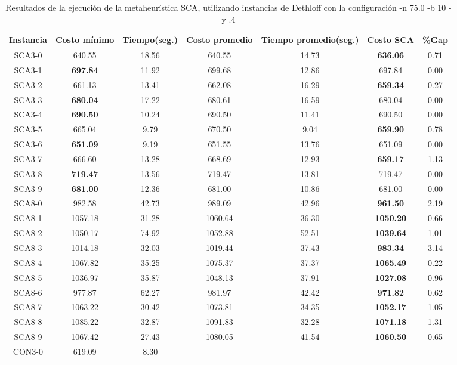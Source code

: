 \begin{table}[ht]
\caption{Resultados de la ejecución de la metaheurística SCA, utilizando instancias de Dethloff con la configuración -n 75.0 -b 10 -y .4}
\centering
\small
\begin{tabular}{c c c c c c c}
\hline\hline
Instancia & Costo mínimo & Tiempo(seg.) & Costo promedio & Tiempo promedio(seg.) & Costo SCA & \%Gap \\ [0.5ex]
\hline
SCA3-0 & 640.55 & 18.56 & 
640.55 & 14.73 & \bf{636.06} & 
0.71\\SCA3-1 & \bf{697.84} & 11.92 & 
699.68 & 12.86 & 697.84 & 0.00\\
SCA3-2 & 661.13 & 13.41 & 
662.08 & 16.29 & \bf{659.34} & 
0.27\\SCA3-3 & \bf{680.04} & 17.22 & 
680.61 & 16.59 & 680.04 & 0.00\\
SCA3-4 & \bf{690.50} & 10.24 & 
690.50 & 11.41 & 690.50 & 0.00\\
SCA3-5 & 665.04 & 9.79 & 
670.50 & 9.04 & \bf{659.90} & 
0.78\\SCA3-6 & \bf{651.09} & 9.19 & 
651.55 & 13.76 & 651.09 & 0.00\\
SCA3-7 & 666.60 & 13.28 & 
668.69 & 12.93 & \bf{659.17} & 
1.13\\SCA3-8 & \bf{719.47} & 13.56 & 
719.47 & 13.81 & 719.47 & 0.00\\
SCA3-9 & \bf{681.00} & 12.36 & 
681.00 & 10.86 & 681.00 & 0.00\\
SCA8-0 & 982.58 & 42.73 & 
989.09 & 42.96 & \bf{961.50} & 
2.19\\SCA8-1 & 1057.18 & 31.28 & 
1060.64 & 36.30 & \bf{1050.20} & 
0.66\\SCA8-2 & 1050.17 & 74.92 & 
1052.88 & 52.51 & \bf{1039.64} & 
1.01\\SCA8-3 & 1014.18 & 32.03 & 
1019.44 & 37.43 & \bf{983.34} & 
3.14\\SCA8-4 & 1067.82 & 35.25 & 
1075.37 & 37.37 & \bf{1065.49} & 
0.22\\SCA8-5 & 1036.97 & 35.87 & 
1048.13 & 37.91 & \bf{1027.08} & 
0.96\\SCA8-6 & 977.87 & 62.27 & 
981.97 & 42.42 & \bf{971.82} & 
0.62\\SCA8-7 & 1063.22 & 30.42 & 
1073.81 & 34.35 & \bf{1052.17} & 
1.05\\SCA8-8 & 1085.22 & 32.87 & 
1091.83 & 32.28 & \bf{1071.18} & 
1.31\\SCA8-9 & 1067.42 & 27.43 & 
1080.05 & 41.54 & \bf{1060.50} & 
0.65\\CON3-0 & 619.09 & 8.30 & 

\end{tabular}
\end{table}
